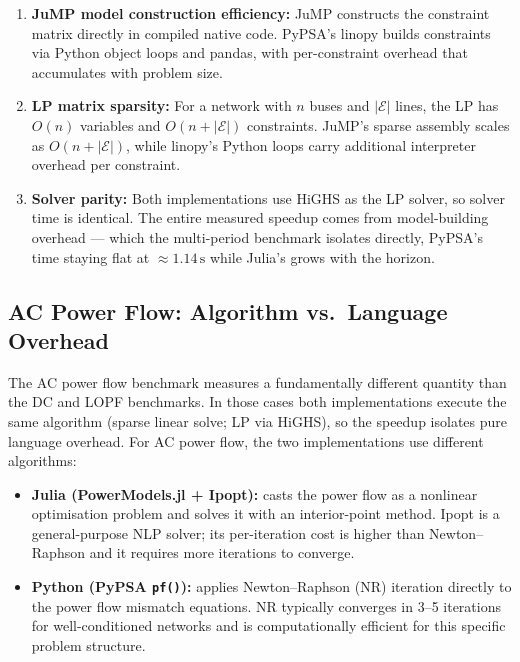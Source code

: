 \begin{enumerate}
    \item \textbf{JuMP model construction efficiency:} JuMP constructs the constraint matrix directly in compiled native code. PyPSA's linopy builds constraints via Python object loops and pandas, with per-constraint overhead that accumulates with problem size.
    \item \textbf{LP matrix sparsity:} For a network with $n$ buses and $|\mathcal{E}|$ lines, the LP has $O(n)$ variables and $O(n + |\mathcal{E}|)$ constraints. JuMP's sparse assembly scales as $O(n + |\mathcal{E}|)$, while linopy's Python loops carry additional interpreter overhead per constraint.
    \item \textbf{Solver parity:} Both implementations use HiGHS as the LP solver, so solver time is identical. The entire measured speedup comes from model-building overhead --- which the multi-period benchmark isolates directly, PyPSA's time staying flat at $\approx 1.14\,\text{s}$ while Julia's grows with the horizon.
\end{enumerate}

\subsection{AC Power Flow: Algorithm vs.\ Language Overhead}
\label{sec:analysis_ac}

The AC power flow benchmark measures a fundamentally different quantity than the DC and LOPF benchmarks. In those cases both implementations execute the same algorithm (sparse linear solve; LP via HiGHS), so the speedup isolates pure language overhead. For AC power flow, the two implementations use different algorithms:

\begin{itemize}
    \item \textbf{Julia (PowerModels.jl + Ipopt):} casts the power flow as a nonlinear optimisation problem and solves it with an interior-point method. Ipopt is a general-purpose NLP solver; its per-iteration cost is higher than Newton--Raphson and it requires more iterations to converge.
    \item \textbf{Python (PyPSA \texttt{pf()}):} applies Newton--Raphson (NR) iteration directly to the power flow mismatch equations. NR typically converges in 3--5 iterations for well-conditioned networks and is computationally efficient for this specific problem structure.
\end{itemize}

